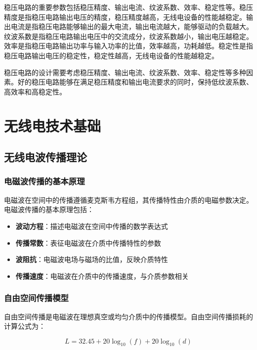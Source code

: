 \documentclass[12pt,UTF8]{ctexbook}
\begin{document}
稳压电路的重要参数包括稳压精度、输出电流、纹波系数、效率、稳定性等。稳压精度是指稳压电路输出电压的精度，稳压精度越高，无线电设备的性能越稳定。输出电流是指稳压电路能够输出的最大电流，输出电流越大，能够驱动的负载越大。纹波系数是指稳压电路输出电压中的交流成分，纹波系数越小，输出电压越稳定。效率是指稳压电路输出功率与输入功率的比值，效率越高，功耗越低。稳定性是指稳压电路输出电压的稳定性，稳定性越高，无线电设备的性能越稳定。

稳压电路的设计需要考虑稳压精度、输出电流、纹波系数、效率、稳定性等多种因素。好的稳压电路能够在满足稳压精度和输出电流要求的同时，保持低纹波系数、高效率和高稳定性。

\part{无线电技术基础}

\chapter{无线电波传播理论}

\section{电磁波传播的基本原理}

电磁波在空间中的传播遵循麦克斯韦方程组，其传播特性由介质的电磁参数决定。电磁波传播的基本原理包括：

\begin{itemize}[leftmargin=3.5em]
    \item \textbf{波动方程}：描述电磁波在空间中传播的数学表达式
    \item \textbf{传播常数}：表征电磁波在介质中传播特性的参数
    \item \textbf{波阻抗}：电磁波电场与磁场的比值，反映介质特性
    \item \textbf{传播速度}：电磁波在介质中的传播速度，与介质参数相关
\end{itemize}

\section{自由空间传播模型}

自由空间传播是电磁波在理想真空或均匀介质中的传播模型。自由空间传播损耗的计算公式为：

\begin{equation}
L = 32.45 + 20\log_{10}(f) + 20\log_{10}(d)
\end{equation}
\end{document}
